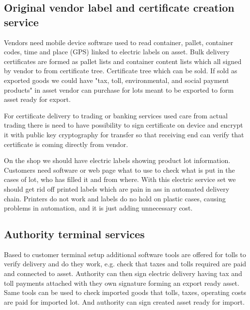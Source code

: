 \subsection{Original vendor label and certificate creation service}
\label{label_and_certificate_service}

Vendors need mobile device software used to read container, pallet, container codes, time and place (GPS) linked to electric labels on asset. Bulk delivery certificates are formed as pallet lists and container content lists which all signed by vendor to from certificate tree. Certificate tree which can be sold. If sold as exported goods we could have "tax, toll, environmental, and social payment products" in asset vendor can purchase for lots meant to be exported to form asset ready for export.

For certificate delivery to trading or banking services used care from actual trading there is need to have possibility to sign certificate on device and encrypt it with public key cryptography for transfer so that receiving end can verify that certificate is coming directly from vendor.

On the shop we should have electric labels showing product lot information. Customers need software or web page what to use to check what is put in the cases of lot, who has filled it and from where. With this electric service set we should get rid off printed labels which are pain in ass in automated delivery chain. Printers do not work and labels do no hold on plastic cases, causing problems in automation, and it is just adding unnecessary cost.

\subsection{Authority terminal services}
\label{authority_terminal_service}

Based to customer terminal setup additional software tools are offered for tolls to verify delivery and do they work, e.g. check that taxes and tolls required are paid and connected to asset. Authority can then sign electric delivery having tax and toll payments attached with they own signature forming an export ready asset. Same tools can be used to check imported goods that tolls, taxes, operating costs are paid for imported lot. And authority can sign created asset ready for import.

